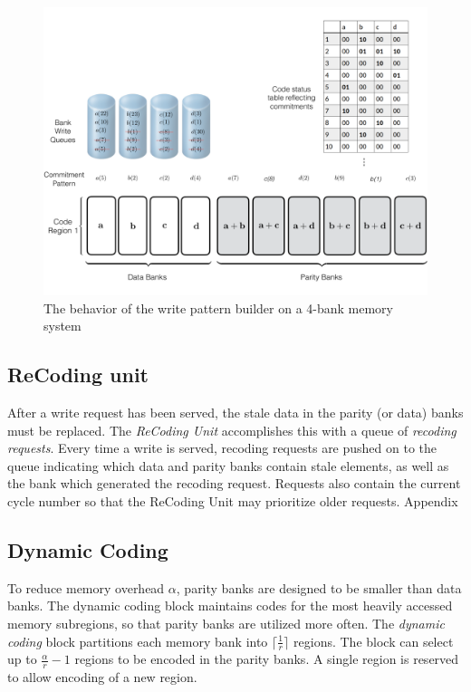 \begin{figure}[t!]
\centering
         \includegraphics[width=\linewidth]{fig/Write-Algo-Example.png}
	\caption{The behavior of the write pattern builder on a 4-bank memory system}
	\label{fig:writeAlgoAccessPattern}
\end{figure}
\subsection{ReCoding unit}
\label{sec:recoding}
After a write request has been served, the stale data in the parity (or data) banks must be replaced. The \textit{ReCoding Unit} accomplishes this with a queue of {\em recoding requests}. Every time a write is served, recoding requests are pushed on to the queue indicating which data and parity banks contain stale elements, as well as the bank which generated the recoding request. Requests also contain the current cycle number so that the ReCoding Unit may prioritize older requests. Appendix

\subsection{Dynamic Coding}
\label{sec:dynamicCoding}
To reduce memory overhead $\alpha$, parity banks are designed to be smaller than data banks. The dynamic coding block maintains codes for the most heavily accessed memory subregions, so that parity banks are utilized more often.
%
%
The {\em dynamic coding} block partitions each memory bank into $\lceil\frac{1}{r}\rceil$ regions. The block can select up to $\frac{\alpha}{r} - 1$ regions to be encoded in the parity banks. A single region is reserved to allow encoding of a new region.

